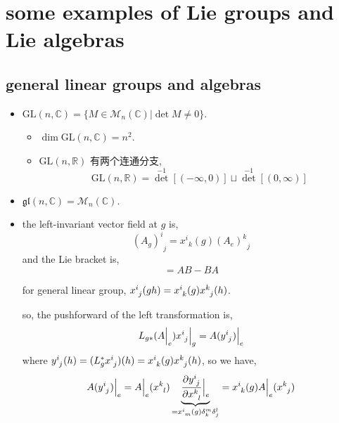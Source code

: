 \chapter{some examples of Lie groups and Lie algebras}
\section{general linear groups and algebras}
\begin{itemize}
	\item $\mathrm{GL}(n, \mathbb{C}) = \{M \in \mathcal{M}_n(\mathbb{C}) | \det M \neq 0\}$.
	\begin{itemize}
		\item $\dim \mathrm{GL}(n, \mathbb{C}) = n^2$.
		
		\item $\mathrm{GL}(n, \mathbb{R})$ 有两个连通分支,
		\begin{equation}
			\mathrm{GL}(n, \mathbb{R}) = {\det}^{- 1}[(- \infty, 0)] \sqcup {\det}^{- 1}[(0, \infty)]
		\end{equation}
	\end{itemize}
	
	\item $\mathfrak{gl}(n, \mathbb{C}) = \mathcal{M}_n(\mathbb{C})$.
	
	\item the left-invariant vector field at $g$ is,
	\begin{equation}
		{(A_g)^i}_j = {x^i}_k(g) {(A_e)^k}_j
	\end{equation}
	and the Lie bracket is,
	\begin{equation}
		[A, B] = A B - B A
	\end{equation}
	
	\begin{tcolorbox}[title=proof:]
		for general linear group, $\tensor{x}{^i_j}(g h) = \tensor{x}{^i_k}(g) \tensor{x}{^k_j}(h)$.
		
		so, the pushforward of the left transformation is,
		\begin{equation}
			L_{g *} (A \Big|_e) \tensor{x}{^i_j} \Big|_g = A(\tensor{y}{^i_j}) \Big|_e
		\end{equation}
		where $\tensor{y}{^i_j}(h) = (L_g^* \tensor{x}{^i_j})(h) = \tensor{x}{^i_k}(g) \tensor{x}{^k_j}(h)$, so we have,
		\begin{equation}
			A(\tensor{y}{^i_j}) \Big|_e = A \Big|_e (\tensor{x}{^k_l}) \underbrace{\frac{\partial \tensor{y}{^i_j}}{\partial \tensor{x}{^k_l}} \Big|_e}_{= \tensor{x}{^i_m}(g) \delta^m_k \delta^l_j} = \tensor{x}{^i_k}(g) A \Big|_e (\tensor{x}{^k_j})
		\end{equation}
		

\end{tcolorbox}
\end{itemize}

